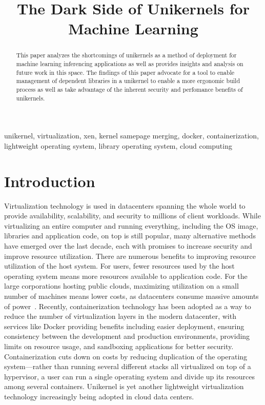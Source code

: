 \documentclass[conference]{IEEEtran}
\begin{document}
\title{The Dark Side of Unikernels for Machine Learning}

\author{
}

\maketitle

\begin{abstract}
	This paper analyzes the shortcomings of unikernels as a method
	of deployment for machine learning inferencing applications as
	well as provides insights and analysis on future work in this
	space. The findings of this paper advocate for a tool to enable
	management of dependent libraries in a unikernel to enable a
	more ergonomic build process as well as take advantage of the
	inherent security and perfomance benefits of unikernels.
\end{abstract}

\begin{IEEEkeywords}
	unikernel, virtualization, xen, kernel samepage merging,
	docker, containerization, lightweight operating system, library
	operating system, cloud computing
\end{IEEEkeywords}

\section{Introduction}

Virtualization technology is used in datacenters spanning the
whole world to provide availability, scalability, and security to
millions of client workloads. While virtualizing an entire
computer and running everything, including the OS image,
libraries and application code, on top is still popular, many
alternative methods have emerged over the last decade, each with
promises to increase security and improve resource utilization.
There are numerous benefits to improving resource utilization of
the host system. For users, fewer resources used by the host
operating system means more resources available to application
code. For the large corporations hosting public clouds,
maximizing utilization on a small number of machines means lower
costs, as datacenters consume massive amounts of
power~\cite{directenergy}.  Recently, containerization technology
has been adopted as a way to reduce the number of virtualization
layers in the modern datacenter, with services like Docker
providing benefits including easier deployment, ensuring
consistency between the development and production environments,
providing limits on resource usage, and sandboxing applications
for better security.  Containerization cuts down on costs by
reducing duplication of the operating system—rather than running
several different stacks all virtualized on top of a hypervisor,
a user can run a single operating system and divide up its
resources among several containers. Unikernel is yet another
lightweight virtualization technology increasingly being adopted
in cloud data centers.
\end{document}
